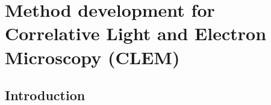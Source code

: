 \chapter{Method development for Correlative Light and Electron Microscopy (CLEM)}
\section{Introduction}
